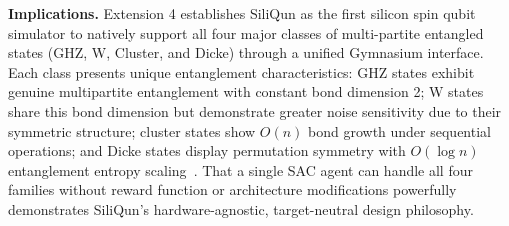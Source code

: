 \textbf{Implications.} Extension 4 establishes SiliQun as the first silicon spin qubit simulator to natively support all four major classes of multi-partite entangled states (GHZ, W, Cluster, and Dicke) through a unified Gymnasium interface. Each class presents unique entanglement characteristics: GHZ states exhibit genuine multipartite entanglement with constant bond dimension 2; W states share this bond dimension but demonstrate greater noise sensitivity due to their symmetric structure; cluster states show $O(n)$ bond growth under sequential operations; and Dicke states display permutation symmetry with $O(\log n)$ entanglement entropy scaling~\cite{Salberger2017}. That a single SAC agent can handle all four families without reward function or architecture modifications powerfully demonstrates SiliQun's hardware-agnostic, target-neutral design philosophy.
